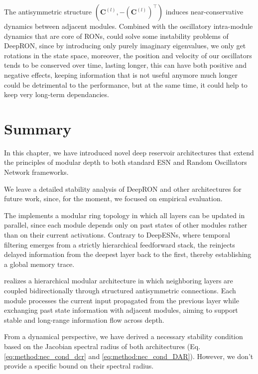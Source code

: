 The antisymmetric structure $(\mathbf{C}^{(l)}, -(\mathbf{C}^{(l)})^\top)$ induces near-conservative dynamics between adjacent modules.
Combined with the oscillatory intra-module dynamics that are core of RONs, \DAO\@ could solve some instability problems of DeepRON,
since by introducing only purely imaginary eigenvalues, we only get rotations in the state space, moreover, the position and velocity of our oscillators 
tends to be conserved over time, lasting longer, this can have both positive and negative effects, keeping information that is not useful anymore much longer could
be detrimental to the performance, but at the same time, it could help to keep very long-term dependancies.


\section{Summary}
In this chapter, we have introduced novel deep reservoir architectures
 that extend the principles of modular depth to both standard ESN and Random Oscillators Network frameworks.

We leave a detailed stability analysis of DeepRON and other architectures for future work, 
since, for the moment, we focused on empirical evaluation.

The \DCR\@ implements a modular ring topology in which all layers can be updated in parallel, 
since each module depends only on past states of other modules rather than on their current activations.
Contrary to DeepESNs, where temporal filtering emerges from a strictly hierarchical
feedforward stack, the \DCR\@ reinjects delayed information from the deepest layer
back to the first, thereby establishing a global memory trace. 


\DAR\@ realizes a hierarchical modular architecture 
in which neighboring layers are coupled bidirectionally through structured antisymmetric connections.
 Each module processes the current input propagated from the previous layer while exchanging 
 past state information with adjacent modules, aiming to support stable and long-range information flow across depth.

From a dynamical perspective, we have derived a necessary stability
condition based on the Jacobian spectral radius of both architectures (Eq. \ref{eq:method:nec_cond_dcr} and \ref{eq:method:nec_cond_DAR}).
However, we don't provide a specific bound on their spectral radius.  